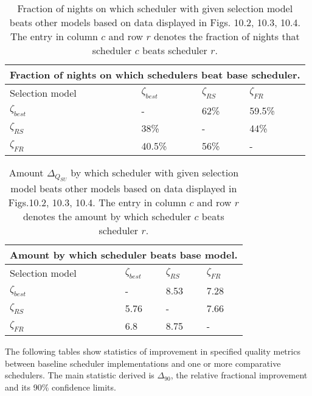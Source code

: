 \clearpage
\begin{table}[h]
\begin{center}
\begin{tabular}{llll}
\toprule
\multicolumn{4}{c}{Fraction of nights on which schedulers beat base scheduler.}\\
\midrule
Selection model & $\zeta_{best}$ & $\zeta_{RS}$ & $\zeta_{FR}$ \\
\midrule
$\zeta_{best}$ & -     & 62\% & 59.5\% \\
$\zeta_{RS}$   & 38\%   & -   & 44\% \\ 
$\zeta_{FR}$   & 40.5\% & 56\% & - \\
\bottomrule 
\end{tabular}
\end{center}
\caption[Fraction of nights on which scheduler with given selection model beats other models.]{Fraction of nights on which scheduler with given selection model beats other models based on data displayed in Figs. 10.2, 10.3, 10.4. The entry in column $c$ and row $r$ denotes the fraction of nights that scheduler $c$ beats scheduler $r$.}
\label{b:f102a}
\end{table}

\begin{table}[h]
\begin{center}
\begin{tabular}{llll}
\toprule
\multicolumn{4}{c}{Amount by which scheduler beats base model.}\\
\midrule
Selection model & $\zeta_{best}$ & $\zeta_{RS}$ & $\zeta_{FR}$ \\
\midrule
$\zeta_{best}$ & -    & 8.53 & 7.28 \\
$\zeta_{RS}$   & 5.76 & -    & 7.66 \\ 
$\zeta_{FR}$   & 6.8  & 8.75 & - \\
\bottomrule
\end{tabular}
\end{center}
\caption[Amount $\Delta_{Q_{SU}}$ by which scheduler with given selection model beats other models.]{Amount $\Delta_{Q_{SU}}$ by which scheduler with given selection model beats other models based on data displayed in Figs.10.2, 10.3, 10.4. The entry in column $c$ and row $r$ denotes the amount by which scheduler $c$ beats scheduler $r$.}
\label{b:f102b}
\end{table}

The following tables show statistics of improvement in specified quality metrics between baseline scheduler implementations and one or more comparative schedulers. The main statistic derived is $\Delta_{90}$, the relative fractional improvement and its 90\% confidence limits.

